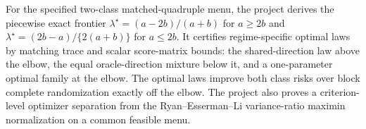 For the specified two-class matched-quadruple menu, the project derives the piecewise exact frontier \(\lambda^\star=(a-2b)/(a+b)\) for \(a\ge2b\) and \(\lambda^\star=(2b-a)/\{2(a+b)\}\) for \(a\le2b\). It certifies regime-specific optimal laws by matching trace and scalar score-matrix bounds: the shared-direction law above the elbow, the equal oracle-direction mixture below it, and a one-parameter optimal family at the elbow. The optimal laws improve both class risks over block complete randomization exactly off the elbow. The project also proves a criterion-level optimizer separation from the Ryan--Esserman--Li variance-ratio maximin normalization on a common feasible menu.